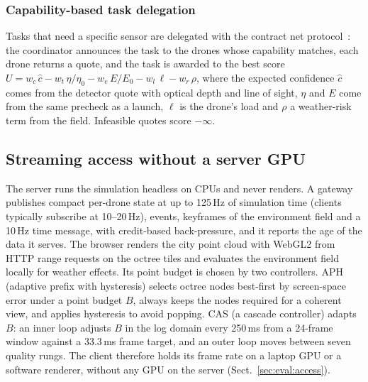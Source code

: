 \subsubsection{Capability-based task delegation}

Tasks that need a specific sensor are delegated with the contract net protocol~\cite{smith1980contract}: the
coordinator announces the task to the drones whose capability matches, each drone returns a quote, and the task is
awarded to the best score
$U = w_c\,\hat c - w_t\,\eta/\eta_0 - w_e\,E/E_0 - w_l\,\ell - w_r\,\rho$,
where the expected confidence $\hat c$ comes from the detector quote with optical depth and line of sight, $\eta$ and
$E$ come from the same precheck as a launch, $\ell$ is the drone's load and $\rho$ a weather-risk term from the field.
Infeasible quotes score $-\infty$.

\subsection{Streaming access without a server GPU}\label{sec:design:access}

The server runs the simulation headless on CPUs and never renders. A gateway publishes compact per-drone state at up
to 125\,Hz of simulation time (clients typically subscribe at 10--20\,Hz), events, keyframes of the environment field
and a 10\,Hz time message, with credit-based back-pressure, and it reports the age of the data it serves. The browser
renders the city point cloud with WebGL2 from HTTP range requests on the octree tiles and evaluates the environment
field locally for weather effects. Its point budget is chosen by two controllers. APH (adaptive prefix with hysteresis)
selects octree nodes best-first by screen-space error under a point budget $B$, always keeps the nodes required for a
coherent view, and applies hysteresis to avoid popping. CAS (a cascade controller) adapts $B$: an inner loop adjusts
$B$ in the log domain every 250\,ms from a 24-frame window against a 33.3\,ms frame target, and an outer loop moves
between seven quality rungs. The client therefore holds its frame rate on a laptop GPU or a software renderer,
without any GPU on the server (Sect.~\ref{sec:eval:access}).
